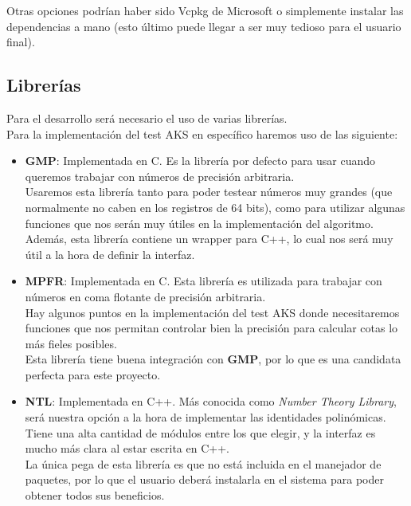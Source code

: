 Otras opciones podrían haber sido Vcpkg de Microsoft o simplemente instalar las dependencias a mano (esto último puede llegar a ser muy tedioso para el usuario final).

\subsection{Librerías}

Para el desarrollo será necesario el uso de varias librerías.\\

Para la implementación del test AKS en específico haremos uso de las siguiente:

\begin{itemize}
	\item \textbf{GMP}: Implementada en C. Es la librería por defecto para usar cuando queremos trabajar con números de precisión arbitraria.\\
	
	Usaremos esta librería tanto para poder testear números muy grandes (que normalmente no caben en los registros de 64 bits), como para utilizar algunas funciones que nos serán muy útiles en la implementación del algoritmo.\\
	
	Además, esta librería contiene un wrapper para C++, lo cual nos será muy útil a la hora de definir la interfaz.\\
	
	\item \textbf{MPFR}: Implementada en C. Esta librería es utilizada para trabajar con números en coma flotante de precisión arbitraria.\\
	
	Hay algunos puntos en la implementación del test AKS donde necesitaremos funciones que nos permitan controlar bien la precisión para calcular cotas lo más fieles posibles.\\
	
	Esta librería tiene buena integración con \textbf{GMP}, por lo que es una candidata perfecta para este proyecto.
	
	\item \textbf{NTL}: Implementada en C++. Más conocida como \textit{Number Theory Library}, será nuestra opción a la hora de implementar las identidades polinómicas.\\
	
	Tiene una alta cantidad de módulos entre los que elegir, y la interfaz es mucho más clara al estar escrita en C++.\\
	
	La única pega de esta librería es que no está incluida en el manejador de paquetes, por lo que el usuario deberá instalarla en el sistema para poder obtener todos sus beneficios.
\end{itemize}

